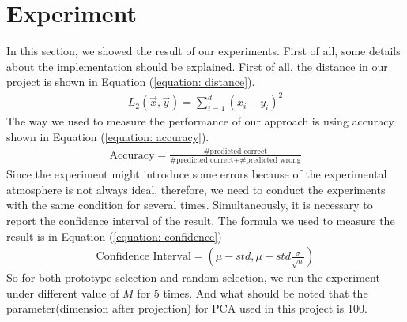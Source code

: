 \documentclass{article}
\begin{document}
\section{Experiment}
In this section, we showed the result of our experiments. First of all, some details about the implementation should be explained. First of all, the distance in our project is shown in Equation (\ref{equation: distance}).
\begin{equation}
    \label{equation: distance}
    \begin{split}
    L_2(\vec{x},\vec{y}) = \sum_{i=1}^d{(x_i-y_i)^2}
    \end{split}
\end{equation}
The way we used to measure the performance of our approach is using accuracy shown in Equation (\ref{equation: accuracy}).
\begin{equation}
    \label{equation: accuracy}
    \begin{split}
    \text{Accuracy} = \frac{\text{\#predicted correct}}{\text{\#predicted correct}+\text{\#predicted wrong}}
    \end{split}
\end{equation}
Since the experiment might introduce some errors because of the experimental atmosphere is not always ideal, therefore, we need to conduct the experiments with the same condition for several times. Simultaneously, it is necessary to report the confidence interval of the result. The formula we used to measure the result is in Equation (\ref{equation: confidence})
\begin{equation}
    \label{equation: confidence}
    \begin{split}
    \text{Confidence Interval} = (\mu - std,\mu + std \frac{\sigma}{\sqrt{n}})
    \end{split}
\end{equation}
So for both prototype selection and random selection, we run the experiment under different value of $M$ for 5 times. And what should be noted that the parameter(dimension after projection) for PCA used in this project is 100.
\end{document}
